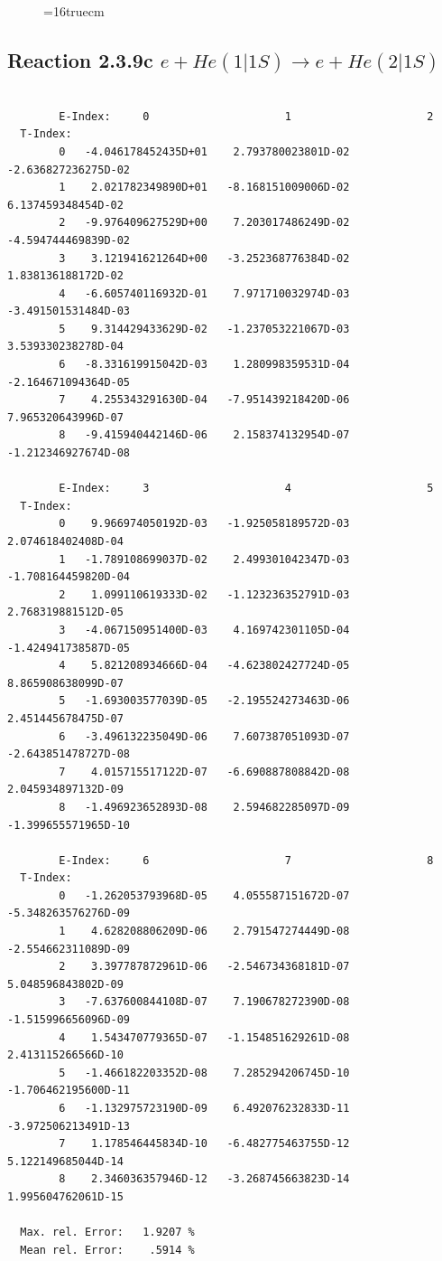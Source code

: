 \documentclass[12pt,dvips]{article}
\begin{document}
\begin{figure} \label{2.3.9b}
\epsfxsize=16truecm
\end{figure}
\newpage


\subsection{
Reaction 2.3.9c  $e + He(1|1S) \rightarrow e + He(2|1S) $
}



\begin{small}\begin{verbatim}

        E-Index:     0                     1                     2
  T-Index:
        0   -4.046178452435D+01    2.793780023801D-02   -2.636827236275D-02
        1    2.021782349890D+01   -8.168151009006D-02    6.137459348454D-02
        2   -9.976409627529D+00    7.203017486249D-02   -4.594744469839D-02
        3    3.121941621264D+00   -3.252368776384D-02    1.838136188172D-02
        4   -6.605740116932D-01    7.971710032974D-03   -3.491501531484D-03
        5    9.314429433629D-02   -1.237053221067D-03    3.539330238278D-04
        6   -8.331619915042D-03    1.280998359531D-04   -2.164671094364D-05
        7    4.255343291630D-04   -7.951439218420D-06    7.965320643996D-07
        8   -9.415940442146D-06    2.158374132954D-07   -1.212346927674D-08

        E-Index:     3                     4                     5
  T-Index:
        0    9.966974050192D-03   -1.925058189572D-03    2.074618402408D-04
        1   -1.789108699037D-02    2.499301042347D-03   -1.708164459820D-04
        2    1.099110619333D-02   -1.123236352791D-03    2.768319881512D-05
        3   -4.067150951400D-03    4.169742301105D-04   -1.424941738587D-05
        4    5.821208934666D-04   -4.623802427724D-05    8.865908638099D-07
        5   -1.693003577039D-05   -2.195524273463D-06    2.451445678475D-07
        6   -3.496132235049D-06    7.607387051093D-07   -2.643851478727D-08
        7    4.015715517122D-07   -6.690887808842D-08    2.045934897132D-09
        8   -1.496923652893D-08    2.594682285097D-09   -1.399655571965D-10

        E-Index:     6                     7                     8
  T-Index:
        0   -1.262053793968D-05    4.055587151672D-07   -5.348263576276D-09
        1    4.628208806209D-06    2.791547274449D-08   -2.554662311089D-09
        2    3.397787872961D-06   -2.546734368181D-07    5.048596843802D-09
        3   -7.637600844108D-07    7.190678272390D-08   -1.515996656096D-09
        4    1.543470779365D-07   -1.154851629261D-08    2.413115266566D-10
        5   -1.466182203352D-08    7.285294206745D-10   -1.706462195600D-11
        6   -1.132975723190D-09    6.492076232833D-11   -3.972506213491D-13
        7    1.178546445834D-10   -6.482775463755D-12    5.122149685044D-14
        8    2.346036357946D-12   -3.268745663823D-14    1.995604762061D-15

  Max. rel. Error:   1.9207 %
  Mean rel. Error:    .5914 %



\end{verbatim}\end{small}
\end{document}
